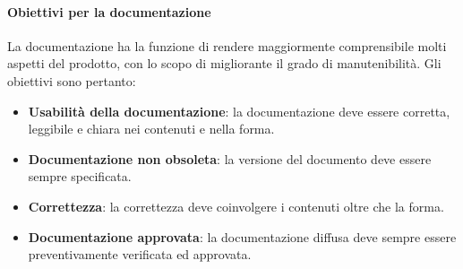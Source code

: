 \documentclass[12pt,a4paper]{article}
\begin{document}
\paragraph{Obiettivi per la documentazione}
La documentazione ha la funzione di rendere maggiormente comprensibile molti aspetti del prodotto, con lo scopo di migliorante il grado di manutenibilità. 
Gli obiettivi sono pertanto:
\begin{itemize}
	\item\textbf{Usabilità della documentazione}: la documentazione deve essere corretta, leggibile e chiara nei contenuti e nella forma.
	\item\textbf{Documentazione non obsoleta}: la versione del documento deve essere sempre specificata.
	\item\textbf{Correttezza}: la correttezza deve coinvolgere i contenuti oltre che la forma.
	\item\textbf{Documentazione approvata}: la documentazione diffusa deve sempre essere preventivamente verificata ed approvata.
\end{itemize}
\end{document}
